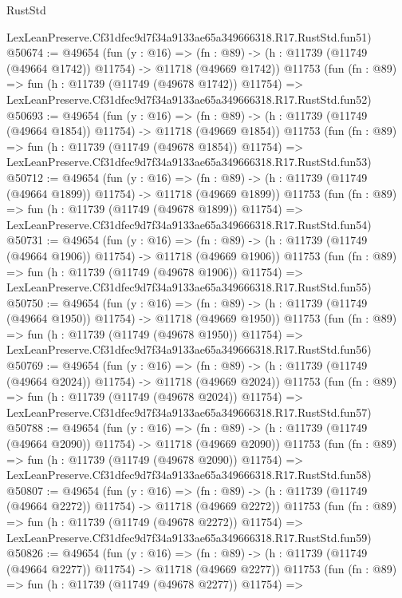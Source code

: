\begin{lexlean}{RustStd}
\begin{coremodule}
    LexLeanPreserve.Cf31dfec9d7f34a9133ae65a349666318.R17.RustStd.fun51)
@50674 := @49654
    (fun (y : @16) =>
    (fn : @89) -> (h : @11739 (@11749 (@49664 @1742)) @11754) -> @11718 (@49669 @1742))
    @11753
    (fun (fn : @89) =>
    fun (h : @11739 (@11749 (@49678 @1742)) @11754) =>
    LexLeanPreserve.Cf31dfec9d7f34a9133ae65a349666318.R17.RustStd.fun52)
@50693 := @49654
    (fun (y : @16) =>
    (fn : @89) -> (h : @11739 (@11749 (@49664 @1854)) @11754) -> @11718 (@49669 @1854))
    @11753
    (fun (fn : @89) =>
    fun (h : @11739 (@11749 (@49678 @1854)) @11754) =>
    LexLeanPreserve.Cf31dfec9d7f34a9133ae65a349666318.R17.RustStd.fun53)
@50712 := @49654
    (fun (y : @16) =>
    (fn : @89) -> (h : @11739 (@11749 (@49664 @1899)) @11754) -> @11718 (@49669 @1899))
    @11753
    (fun (fn : @89) =>
    fun (h : @11739 (@11749 (@49678 @1899)) @11754) =>
    LexLeanPreserve.Cf31dfec9d7f34a9133ae65a349666318.R17.RustStd.fun54)
@50731 := @49654
    (fun (y : @16) =>
    (fn : @89) -> (h : @11739 (@11749 (@49664 @1906)) @11754) -> @11718 (@49669 @1906))
    @11753
    (fun (fn : @89) =>
    fun (h : @11739 (@11749 (@49678 @1906)) @11754) =>
    LexLeanPreserve.Cf31dfec9d7f34a9133ae65a349666318.R17.RustStd.fun55)
@50750 := @49654
    (fun (y : @16) =>
    (fn : @89) -> (h : @11739 (@11749 (@49664 @1950)) @11754) -> @11718 (@49669 @1950))
    @11753
    (fun (fn : @89) =>
    fun (h : @11739 (@11749 (@49678 @1950)) @11754) =>
    LexLeanPreserve.Cf31dfec9d7f34a9133ae65a349666318.R17.RustStd.fun56)
@50769 := @49654
    (fun (y : @16) =>
    (fn : @89) -> (h : @11739 (@11749 (@49664 @2024)) @11754) -> @11718 (@49669 @2024))
    @11753
    (fun (fn : @89) =>
    fun (h : @11739 (@11749 (@49678 @2024)) @11754) =>
    LexLeanPreserve.Cf31dfec9d7f34a9133ae65a349666318.R17.RustStd.fun57)
@50788 := @49654
    (fun (y : @16) =>
    (fn : @89) -> (h : @11739 (@11749 (@49664 @2090)) @11754) -> @11718 (@49669 @2090))
    @11753
    (fun (fn : @89) =>
    fun (h : @11739 (@11749 (@49678 @2090)) @11754) =>
    LexLeanPreserve.Cf31dfec9d7f34a9133ae65a349666318.R17.RustStd.fun58)
@50807 := @49654
    (fun (y : @16) =>
    (fn : @89) -> (h : @11739 (@11749 (@49664 @2272)) @11754) -> @11718 (@49669 @2272))
    @11753
    (fun (fn : @89) =>
    fun (h : @11739 (@11749 (@49678 @2272)) @11754) =>
    LexLeanPreserve.Cf31dfec9d7f34a9133ae65a349666318.R17.RustStd.fun59)
@50826 := @49654
    (fun (y : @16) =>
    (fn : @89) -> (h : @11739 (@11749 (@49664 @2277)) @11754) -> @11718 (@49669 @2277))
    @11753
    (fun (fn : @89) =>
    fun (h : @11739 (@11749 (@49678 @2277)) @11754) =>

\end{coremodule}
\end{lexlean}
